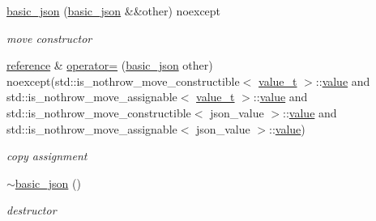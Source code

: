 \begin{DoxyCompactItemize}
\mbox{\hyperlink{classnlohmann_1_1basic__json_a9a06d1efd50a00f4889f831f851ce124}{basic\+\_\+json}} (\mbox{\hyperlink{classnlohmann_1_1basic__json}{basic\+\_\+json}} \&\&other) noexcept
\begin{DoxyCompactList}\small\item\em move constructor \end{DoxyCompactList}\item 
\mbox{\hyperlink{classnlohmann_1_1basic__json_ac6a5eddd156c776ac75ff54cfe54a5bc}{reference}} \& \mbox{\hyperlink{classnlohmann_1_1basic__json_aab256df8c5594ec693035822fa1e2904}{operator=}} (\mbox{\hyperlink{classnlohmann_1_1basic__json}{basic\+\_\+json}} other) noexcept(std\+::is\+\_\+nothrow\+\_\+move\+\_\+constructible$<$ \mbox{\hyperlink{namespacenlohmann_1_1detail_a90aa5ef615aa8305e9ea20d8a947980f}{value\+\_\+t}} $>$\+::\mbox{\hyperlink{classnlohmann_1_1basic__json_adcf8ca5079f5db993820bf50036bf45d}{value}} and std\+::is\+\_\+nothrow\+\_\+move\+\_\+assignable$<$ \mbox{\hyperlink{namespacenlohmann_1_1detail_a90aa5ef615aa8305e9ea20d8a947980f}{value\+\_\+t}} $>$\+::\mbox{\hyperlink{classnlohmann_1_1basic__json_adcf8ca5079f5db993820bf50036bf45d}{value}} and std\+::is\+\_\+nothrow\+\_\+move\+\_\+constructible$<$ json\+\_\+value $>$\+::\mbox{\hyperlink{classnlohmann_1_1basic__json_adcf8ca5079f5db993820bf50036bf45d}{value}} and std\+::is\+\_\+nothrow\+\_\+move\+\_\+assignable$<$ json\+\_\+value $>$\+::\mbox{\hyperlink{classnlohmann_1_1basic__json_adcf8ca5079f5db993820bf50036bf45d}{value}})
\begin{DoxyCompactList}\small\item\em copy assignment \end{DoxyCompactList}\item 
\mbox{\hyperlink{classnlohmann_1_1basic__json_a42347bbce75ba5571e292a3540af30e0}{$\sim$basic\+\_\+json}} ()
\begin{DoxyCompactList}\small\item\em destructor \end{DoxyCompactList}\end{DoxyCompactItemize}
